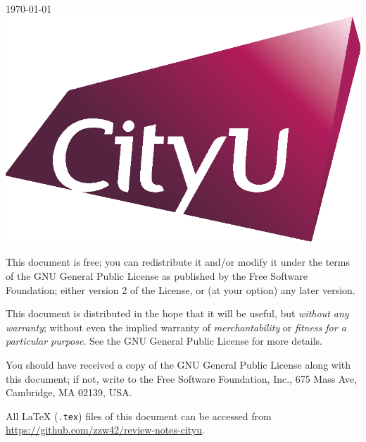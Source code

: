 \begin{titlepage}


{\large \today}\\[2cm] %

\vspace{5cm}
\includegraphics[scale=0.5]{figures/CityU_logo_2015.eps}\\[1cm] %



\vfill %
\end{titlepage}

\noindent

This document is free; you can redistribute it and/or modify it under the terms of 
the GNU General Public License as published by the Free Software Foundation; either 
version 2 of the License, or (at your option) any later version.

This document is distributed in the hope that it will be useful, but \emph{without any 
warranty}; without even the implied warranty of \emph{merchantability} or \emph{fitness 
for a particular purpose}. See the GNU General Public License for more details.

You should have received a copy of the GNU General Public License along with this document; 
if not, write to the Free Software Foundation, Inc., 675 Mass Ave, Cambridge, MA 02139, USA.

All \LaTeX{} (\texttt{.tex}) files of this document can be accessed from
\url{https://github.com/zzw42/review-notes-cityu}.